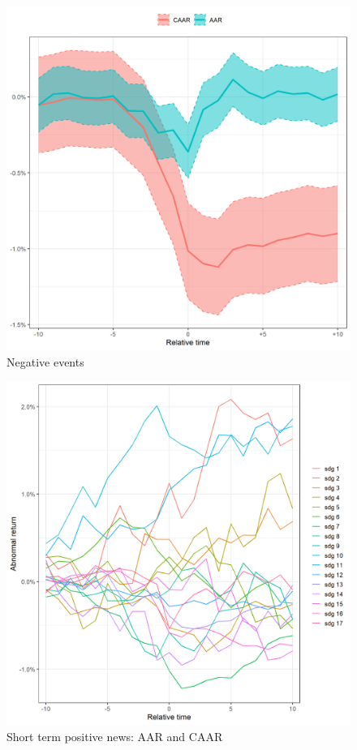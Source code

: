 \begin{figure}[!tbp]
\begin{minipage}[b]{0.45\textwidth}
    \includegraphics[scale=0.45]{Projekt/1.Figures analysis/ST_negative_all_CI.png}
    \caption{Negative events}
  \end{minipage}
\end{figure}






\begin{figure}
    \centering
    \includegraphics[scale=0.6]{Projekt/1.Figures analysis/ST_negative_sdgs.png}
    \caption{Short term positive news: AAR and CAAR}
    \label{fig:ST_pos_news}
\end{figure}